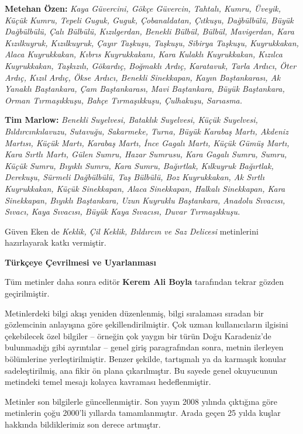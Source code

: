 \documentclass[
  10.5pt,
  a4paper,
  DIV=11,
  numbers=noendperiod,
  twocolumn]{scrreprt}
\begin{document}
\textbf{Metehan Özen:} \emph{Kaya Güvercini, Gökçe Güvercin, Tahtalı,
Kumru, Üveyik, Küçük Kumru, Tepeli Guguk, Guguk, Çobanaldatan, Çıtkuşu,
Dağbülbülü, Büyük Dağbülbülü, Çalı Bülbülü, Kızılgerdan, Benekli Bülbül,
Bülbül, Mavigerdan, Kara Kızılkuyruk, Kızılkuyruk, Çayır Taşkuşu,
Taşkuşu, Sibirya Taşkuşu, Kuyrukkakan, Alaca Kuyrukkakan, Kıbrıs
Kuyrukkakanı, Kara Kulaklı Kuyrukkakan, Kızılca Kuyrukkakan, Taşkızılı,
Gökardıç, Boğmaklı Ardıç, Karatavuk, Tarla Ardıcı, Öter Ardıç, Kızıl
Ardıç, Ökse Ardıcı, Benekli Sinekkapan, Kayın Baştankarası, Ak Yanaklı
Baştankara, Çam Baştankarası, Mavi Baştankara, Büyük Baştankara, Orman
Tırmaşıkkuşu, Bahçe Tırmaşıkkuşu, Çulhakuşu, Sarıasma.}

\textbf{Tim Marlow:} \emph{Benekli Suyelvesi, Bataklık Suyelvesi, Küçük
Suyelvesi, Bıldırcınkılavuzu, Sutavuğu, Sakarmeke, Turna, Büyük Karabaş
Martı, Akdeniz Martısı, Küçük Martı, Karabaş Martı, İnce Gagalı Martı,
Küçük Gümüş Martı, Kara Sırtlı Martı, Gülen Sumru, Hazar Sumrusu, Kara
Gagalı Sumru, Sumru, Küçük Sumru, Bıyıklı Sumru, Kara Sumru, Bağırtlak,
Kılkuyruk Bağırtlak, Derekuşu, Sürmeli Dağbülbülü, Taş Bülbülü, Boz
Kuyrukkakan, Ak Sırtlı Kuyrukkakan, Küçük Sinekkapan, Alaca Sinekkapan,
Halkalı Sinekkapan, Kara Sinekkapan, Bıyıklı Baştankara, Uzun Kuyruklu
Baştankara, Anadolu Sıvacısı, Sıvacı, Kaya Sıvacısı, Büyük Kaya
Sıvacısı, Duvar Tırmaşıkkuşu.}

Güven Eken de \emph{Keklik, Çil Keklik, Bıldırcın ve Saz Delicesi}
metinlerini hazırlayarak katkı vermiştir.

\textbf{Türkçeye Çevrilmesi ve Uyarlanması}

Tüm metinler daha sonra editör \textbf{Kerem Ali Boyla} tarafından
tekrar gözden geçirilmiştir.

Metinlerdeki bilgi akışı yeniden düzenlenmiş, bilgi sıralaması sıradan
bir gözlemcinin anlayışına göre şekillendirilmiştir. Çok uzman
kullanıcıların ilgisini çekebilecek özel bilgiler -- örneğin çok yaygın
bir türün Doğu Karadeniz'de bulunmadığı gibi ayrıntılar -- genel giriş
paragrafından sonra, metnin ilerleyen bölümlerine yerleştirilmiştir.
Benzer şekilde, tartışmalı ya da karmaşık konular sadeleştirilmiş, ana
fikir ön plana çıkarılmıştır. Bu sayede genel okuyucunun metindeki temel
mesajı kolayca kavraması hedeflenmiştir.

Metinler son bilgilerle güncellenmiştir. Son yayın 2008 yılında
çıktığına göre metinlerin çoğu 2000'li yıllarda tamamlanmıştır. Arada
geçen 25 yılda kuşlar hakkında bildiklerimiz son derece artmıştır.
\end{document}
